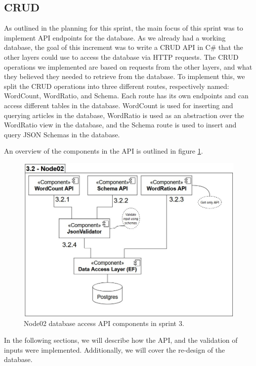 \subsection{CRUD}

As outlined in the planning for this sprint, the main focus of this sprint was to implement API endpoints for the database.
As we already had a working database, the goal of this increment was to write a CRUD API in C\# that the other layers could use to access the database via HTTP requests.
The CRUD operations we implemented are based on requests from the other layers, and what they believed they needed to retrieve from the database.
To implement this, we split the CRUD operations into three different routes, respectively named: WordCount, WordRatio, and Schema. Each route has its own endpoints and can access different tables in the database. WordCount is used for inserting and querying articles in the database, WordRatio is used as an abstraction over the WordRatio view in the database, and the Schema route is used to insert and query JSON Schemas in the database.

An overview of the components in the API is outlined in figure \ref{Node02Sprint3}.

\begin{figure}[h]
    \centering
    \includegraphics[width=\linewidth]{Images/Node02Pipeline.jpg}
    \caption{Node02 database access API components in sprint 3.}
    \label{Node02Sprint3}
\end{figure}

In the following sections, we will describe how the API, and the validation of inputs were implemented. Additionally, we will cover the re-design of the database.

